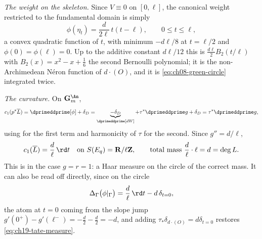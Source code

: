 \begin{example}
\emph{The weight on the skeleton.}  Since $V\equiv0$ on $[0,\ell]$, the
canonical weight restricted to the fundamental domain is simply
\begin{equation}
\label{eq:ch19-tate-weight}
 \phi(\eta_t)=\frac{d}{2\ell}\,t(t-\ell),
 \qquad 0\leq t\leq\ell,
\end{equation}
a convex quadratic function of $t$, with minimum $-d\ell/8$ at
$t=\ell/2$ and
$\phi(0)=\phi(\ell)=0$.  Up to the additive constant $d\ell/12$ this is
$\tfrac{d\ell}{2}B_2(t/\ell)$ with $B_2(x)=x^2-x+\tfrac16$ the second
Bernoulli polynomial; it is the non-Archimedean N\'eron function of
$d\cdot(O)$, and it is \eqref{eq:ch08-green-circle} integrated twice.

\emph{The curvature.}  On $\mathbf G_m^{\An}$,
\[
 c_1(p^*\overline L)
 =\dprimeddprime[\phi]+\delta_D
 =\underbrace{-\delta_D}_{\dprimeddprime[dW]}
   +\tau^*\dprimeddprime g+\delta_D
 =\tau^*\dprimeddprime g,
\]
using  for the first term and harmonicity of
$\tau$ for the second.  Since $g''=d/\ell$,
\begin{equation}
\label{eq:ch19-tate-measure}
 c_1(\overline L)=\frac d\ell\,\rd t
 \quad\text{on }S(E_q)=\mathbf R/\ell\mathbf Z,
 \qquad\text{total mass }\frac d\ell\cdot\ell=d=\deg L .
\end{equation}
This is  in the case $g=r=1$: a Haar measure
on the circle of the correct mass.  It can also be read off directly, since
on the circle
\[
 \Delta_\Gamma\bigl(\phi|_\Gamma\bigr)
 =\frac d\ell\,\rd t-d\,\delta_{t=0},
\]
the atom at $t=0$ coming from the slope jump
$g'(0^+)-g'(\ell^-)=-\tfrac d2-\tfrac d2=-d$, and adding
$\tau_*\delta_{d\cdot(O)}=d\delta_{t=0}$ restores
\eqref{eq:ch19-tate-measure}.


\end{example}
